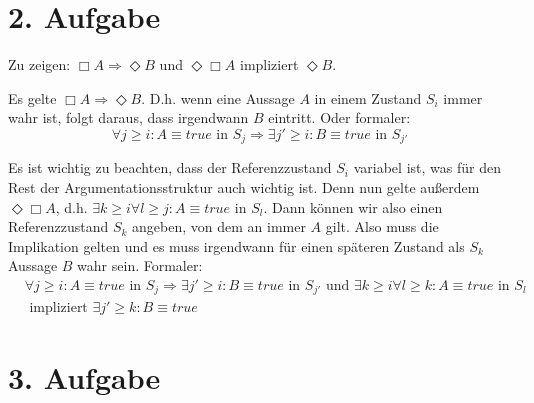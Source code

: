\documentclass[numbers=noendperiod]{scrartcl}
\begin{document}
\section*{2. Aufgabe}

Zu zeigen: $\Box A \Rightarrow \Diamond B $ und $\Diamond \Box A$ impliziert $\Diamond B$.

Es gelte $\Box A \Rightarrow \Diamond B $. D.h. wenn eine Aussage $A$ in einem Zustand $S_i$ immer wahr ist, folgt daraus, dass irgendwann $B$ eintritt. Oder formaler:
\begin{equation}
	\forall j \ge i : A \equiv true \text{ in } S_j \Rightarrow \exists j'\ge i : B \equiv true \text{ in } S_{j'}
\end{equation}

Es ist wichtig zu beachten, dass der Referenzzustand $S_i$ variabel ist, was für den Rest der Argumentationsstruktur auch wichtig ist. Denn nun gelte außerdem $\Diamond \Box A$, d.h. $\exists k \ge i \forall l \ge j : A \equiv true \text{ in } S_l$. Dann können wir also einen Referenzzustand $S_k$ angeben, von dem an immer $A$ gilt. Also muss die Implikation gelten und es muss irgendwann für einen späteren Zustand als $S_k$ Aussage $B$ wahr sein. Formaler:
\begin{align}
	&  \forall j \ge i : A \equiv true \text{ in } S_j \Rightarrow \exists j'\ge i : B \equiv true \text{ in } S_{j'} \text{ und } \exists k \ge i \forall l \ge k : A \equiv true \text{ in } S_l\\
	&  \text{ impliziert } \exists j' \ge k: B \equiv true
\end{align}

\section*{3. Aufgabe}
\end{document}
